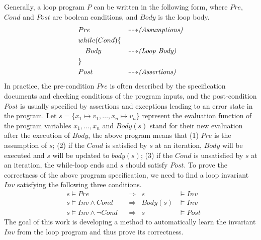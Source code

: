 Generally, a loop program $P$ can be written in the following form, 
where $\mathit{Pre}$, $\mathit{Cond}$ and $\mathit{Post}$ are boolean conditions, 
and $\mathit{Body}$ is the loop body. 
\begin{align*}
&Pre & \dashrightarrow & \text{\emph{(Assumptions)}} \\
&while (Cond) \{ && \\
&\quad Body & \dashrightarrow & \text{\emph{(Loop Body)}} \\
&\} && \\
&Post & \dashrightarrow & \text{\emph{(Assertions)}} 
\end{align*}
In practice, the pre-condition $\mathit{Pre}$ is often described by 
the specification documents and checking conditions of the program inputs, 
and the post-condition $\mathit{Post}$ is usually specified 
by assertions and exceptions leading to an error state in the program. 
Let $s = \{ x_1 \mapsto v_1, \ldots, x_n \mapsto v_n \}$ represent 
the evaluation function of the program variables $x_1, \ldots, x_n$
and $\mathit{Body}(s)$ stand for their new evaluation after the execution of $\mathit{Body}$, 
the above program means that (1) $\mathit{Pre}$ is the assumption of $s$; 
(2) if the $\mathit{Cond}$ is satisfied by $s$ at an iteration, 
$\mathit{Body}$ will be executed and $s$ will be updated to $\mathit{body}(s)$; 
(3) if the $\mathit{Cond}$ is unsatisfied by $s$ at an iteration, 
the while-loop ends and $s$ should satisfy $\mathit{Post}$. 
To prove the correctness of the above program specification, 
we need to find a loop invariant $\mathit{Inv}$ satisfying the following three conditions. 
\begin{align}
    &s \models \mathit{Pre} 
        &&\Longrightarrow & s &\models \mathit{Inv} \label{inv:pre} \\
    &s \models \mathit{Inv} \wedge \mathit{Cond} 
        &&\Longrightarrow & \mathit{Body}(s) &\models \mathit{Inv} \label{inv:loop} \\
    &s \models \mathit{Inv} \wedge \neg\mathit{Cond} 
        &&\Longrightarrow & s &\models \mathit{Post} \label{inv:post}
\end{align}
The goal of this work is developing a method to automatically learn 
the invariant $\mathit{Inv}$ from the loop program and thus prove its correctness. 


